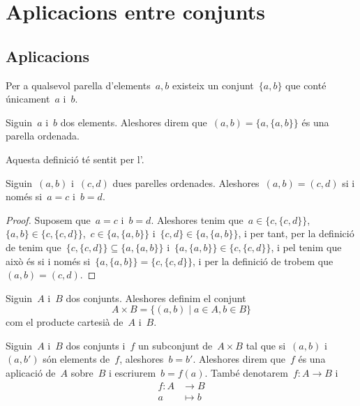 \documentclass[../../main.tex]{subfiles}
\begin{document}
\section{Aplicacions entre conjunts}
    \subsection{Aplicacions}
    \begin{axiom}
        \label{axiom:axioma del parell}
        Per a qualsevol parella d'elements~\(a,b\) existeix un conjunt~\(\{a,b\}\) que conté únicament~\(a\) i~\(b\).
    \end{axiom}
    \begin{definition}
        \label{def:parelles ordenades}
        Siguin~\(a\) i~\(b\) dos elements.
        Aleshores direm que~\((a,b)=\{a,\{a,b\}\}\) és una parella ordenada.

        Aquesta definició té sentit per l'.
    \end{definition}
    \begin{proposition}
        \label{prop:parelles ordenades}
        Siguin~\((a,b)\) i~\((c,d)\) dues parelles ordenades.
        Aleshores~\((a,b)=(c,d)\) si i només si~\(a=c\) i~\(b=d\).
        \begin{proof}
            Suposem que~\(a=c\) i~\(b=d\).
            Aleshores tenim que~\(a\in\{c,\{c,d\}\}\),~\(\{a,b\}\in\{c,\{c,d\}\}\),~\(c\in\{a,\{a,b\}\}\) i~\(\{c,d\}\in\{a,\{a,b\}\}\), i per tant, per la definició de  tenim que~\(\{c,\{c,d\}\}\subseteq\{a,\{a,b\}\}\) i~\(\{a,\{a,b\}\}\in\{c,\{c,d\}\}\), i pel  tenim que això és si i només si~\(\{a,\{a,b\}\}=\{c,\{c,d\}\}\), i per la definició de  trobem que~\((a,b)=(c,d)\).
        \end{proof}
    \end{proposition}
    \begin{definition}
        \label{def:producte cartesià de conjunts}
        Siguin~\(A\) i~\(B\) dos conjunts.
        Aleshores definim el conjunt
        \[
            A\times B=\{(a,b)\mid a\in A,b\in B\}
        \]
        com el producte cartesià de~\(A\) i~\(B\).
    \end{definition}
    \begin{definition}[Aplicació]
        \label{def:aplicació}
        Siguin~\(A\) i~\(B\) dos conjunts i~\(f\) un subconjunt de~\(A\times B\) tal que si~\((a,b)\) i~\((a,b')\) són elements de~\(f\), aleshores~\(b=b'\).
        Aleshores direm que~\(f\) és una aplicació de~\(A\) sobre~\(B\) i escriurem~\(b=f(a)\).
        També denotarem~\(f\colon A\longrightarrow B\) i
        \begin{align*}
        f\colon A&\longrightarrow B\\
        a&\longmapsto b
        \end{align*}
    \end{definition}
\end{document}
